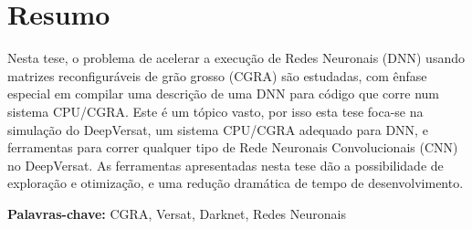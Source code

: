 
\section*{Resumo}



Nesta tese, o problema de acelerar a execução de Redes Neuronais (DNN) usando matrizes reconfiguráveis de grão grosso (CGRA) são estudadas, com ênfase especial em compilar uma descrição de uma DNN para código que corre num sistema
CPU/CGRA. Este é um tópico vasto, por isso esta tese foca-se na simulação do DeepVersat, um sistema CPU/CGRA adequado para DNN, e ferramentas para correr qualquer tipo de Rede Neuronais Convolucionais (CNN) no DeepVersat. 
As ferramentas apresentadas nesta tese dão a possibilidade de exploração e otimização, e uma redução dramática
de tempo de desenvolvimento.


\vfill

\textbf{\Large Palavras-chave:} CGRA, Versat, Darknet, Redes Neuronais

